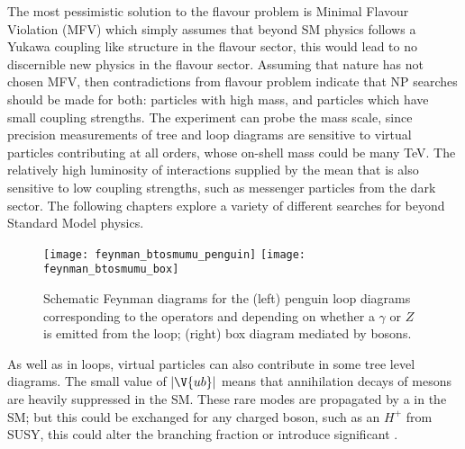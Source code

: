 The most pessimistic solution to the flavour problem is Minimal Flavour Violation (MFV)
which simply assumes that beyond SM physics follows a Yukawa coupling like structure in the flavour
sector, this would lead to no discernible new physics in the flavour sector.
Assuming that nature has not chosen MFV, then contradictions from flavour problem indicate that NP
searches should be made for both: particles
with high mass, and particles which have small coupling strengths.
The \lhcb experiment can probe the mass scale, since precision measurements of tree and loop
diagrams are sensitive to virtual particles contributing at all orders, whose on-shell mass could
be many TeV.
The relatively high luminosity of interactions supplied by the \lhc mean that \lhcb is also
sensitive to low coupling strengths, such as messenger particles from the dark sector.
The following chapters explore a variety of different searches for beyond Standard Model physics.

\begin{figure}
  \begin{center}
    \texttt{[image: feynman\_btosmumu\_penguin]}
    \texttt{[image: feynman\_btosmumu\_box]}
    \caption[Schematic Feynman diagrams for loop and box diagrams]
    {\small
      Schematic Feynman diagrams for the
      (left) penguin loop diagrams corresponding to the operators  and  depending on
      whether a $\gamma$ or $Z$ is emitted from the loop;
      (right)  box diagram mediated by \Wp bosons.
    }
    \label{fig:hhh:loops}
  \end{center}
\end{figure}

As well as in loops, virtual particles can also contribute in some tree level diagrams.
The small value of $|\V{ub}|$ means that annihilation decays of \Bp mesons are heavily
suppressed in the SM.
These rare modes are propagated by a \Wp in the SM; but this could be exchanged for any charged
boson, such as an $H^+$ from SUSY, this could alter the branching fraction or
introduce significant \CPV.

